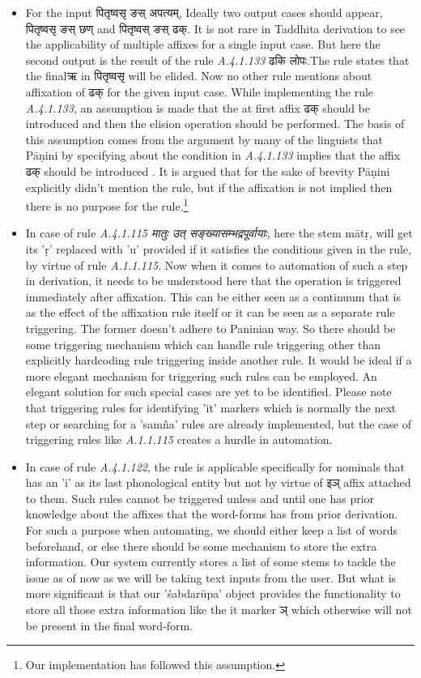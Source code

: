 \documentclass[a4paper,11pt,twoside,openright]{report}
\begin{document}
\begin{itemize}
\item For the input {\skt पितृष्वसृ ङस् अपत्यम्}, Ideally two output cases should appear, {\skt पितृष्वसृ ङस् छण्  and पितृष्वस् ङस् ढक्}. It is not rare in Taddhita derivation to see the applicability of multiple affixes for a single input case. But here the second output is the result of the rule \textsl{ A.4.1.133} {\skt ढकि लोपः}.The rule states that the final{\skt ऋ} in {\skt पितृष्वसृ} will be elided. Now no other rule mentions about affixation of {\skt ढक्} for the given input case. While implementing the rule \textsl{ A.4.1.133}, an assumption is made that the at first affix {\skt ढक्} should be introduced and then the elision operation should be performed. The basis of this assumption comes from the argument by many of the linguists that Pāṇini by specifying about the condition in \textsl{ A.4.1.133} implies that the affix {\skt ढक्} should be introduced \cite{rsbook}. It is argued that for the sake of brevity Pāṇini explicitly didn't mention the rule, but if the affixation is not implied then there is no purpose for the rule.\footnote{Our implementation has followed this assumption.}

\item In case of rule \textsl{ A.4.1.115 \skt मातुः उत् सङ्ख्यासम्भद्रपूर्वायाः}, here the stem mātṛ, will get its 'ṛ' replaced with 'u' provided if it satisfies the conditions given in the rule, by virtue of rule \textsl{ A.1.1.115}. Now when it comes to automation of such a step in derivation, it needs to be understood here that the operation is triggered immediately after affixation. This can be either seen as a continuum that is as the effect of the affixation rule itself or it can be seen as a separate rule triggering. The former doesn't adhere to Paninian way. So there should be some triggering mechanism which can handle rule triggering other than explicitly hardcoding rule triggering inside another rule. It would be ideal if a more elegant mechanism for triggering such rules can be employed. An elegant solution for such special cases are yet to be identified. Please note that triggering rules for identifying 'it' markers which is normally the next step or searching for a 'samña' rules are already implemented, but the case of triggering rules like \textsl{A.1.1.115} creates a hurdle in automation.

\item In case of rule \textsl{ A.4.1.122}, the rule is applicable specifically for nominals that has an 'i' as its last phonological entity but not by virtue of {\skt इञ्} affix attached to them. Such rules cannot be triggered unless and until one has prior knowledge about the affixes that the word-forms has from prior derivation. For such a purpose when automating, we should either keep a list of words beforehand, or else there should be some mechanism to store the extra information. Our system currently stores a list of some stems to tackle the issue as of now as we will be taking text inputs from the user. But what is more significant is that our 'śabdarūpa' object provides the functionality to store all those extra information like the it marker {\skt ञ्} which otherwise will not be present in the final word-form.


\end{itemize}
\end{document}
